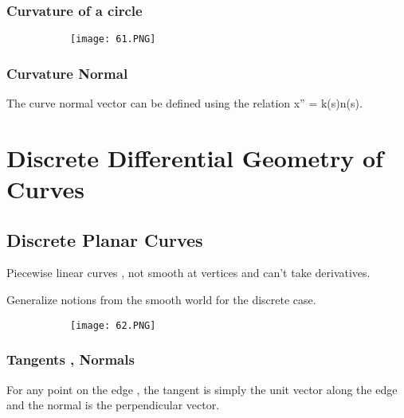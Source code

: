 \documentclass{article}
\begin{document}
\vspace{30mm}

\subsubsection{Curvature of a circle}

    \begin{figure}[ht!]
  \centering
  \begin{subfigure}[b]{0.8\linewidth}
    \texttt{[image: 61.PNG]}
  \end{subfigure}
\end{figure}

\subsubsection{Curvature Normal}

The curve normal vector can be defined using the relation x'' = k(s)n(s). 

\vspace{50mm}

\section{Discrete Differential Geometry of Curves}

\subsection{Discrete Planar Curves}

Piecewise linear curves , not smooth at vertices and can't take derivatives.

Generalize notions from the smooth world for the discrete case.

    \begin{figure}[ht!]
  \centering
  \begin{subfigure}[b]{0.4\linewidth}
    \texttt{[image: 62.PNG]}
  \end{subfigure}
\end{figure}

\subsubsection{Tangents , Normals}


For any point on the edge , the tangent is simply the unit vector along the edge and the normal is the perpendicular vector.
\end{document}
